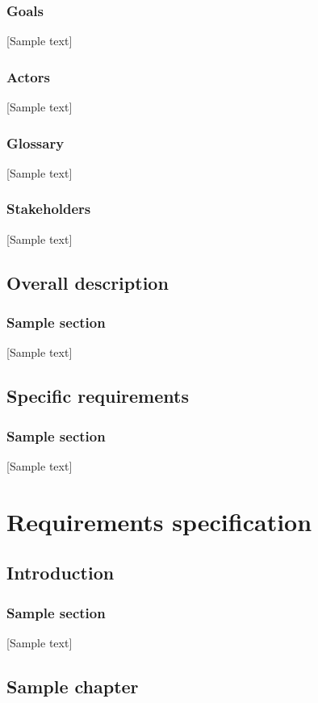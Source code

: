 \documentclass[openright]{report}
\begin{document}
    \section{Goals}
		[Sample text]
	\section{Actors}
		[Sample text]
	\section{Glossary}%
		[Sample text]
	\section{Stakeholders}
		[Sample text]


	\chapter{Overall description}
    \section{Sample section}
		[Sample text]
    \chapter{Specific requirements}
    \section{Sample section}
		[Sample text]

	\part{Requirements specification}
	\chapter{Introduction}
    \section{Sample section}
		[Sample text]
	\chapter{Sample chapter}
\end{document}
